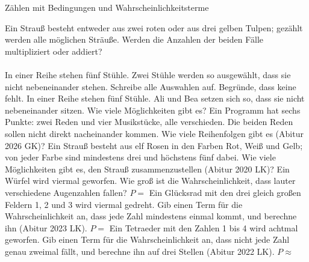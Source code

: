 \setcounter{aufgabe}{11}

\begin{aufgabe}{Zählen mit Bedingungen und Wahrscheinlichkeitsterme}
\begin{teile}
\teil Ein Strauß besteht entweder aus zwei roten oder aus drei gelben Tulpen; gezählt werden alle möglichen Sträuße. Werden die Anzahlen der beiden Fälle multipliziert oder addiert? \\  \\ 
\teil In einer Reihe stehen fünf Stühle. Zwei Stühle werden so ausgewählt, dass sie nicht nebeneinander stehen. Schreibe alle Auswahlen auf. Begründe, dass keine fehlt. \leerfeld
\teil In einer Reihe stehen fünf Stühle. Ali und Bea setzen sich so, dass sie nicht nebeneinander sitzen. Wie viele Möglichkeiten gibt es? \leerfeld
\teil Ein Programm hat sechs Punkte: zwei Reden und vier Musikstücke, alle verschieden. Die beiden Reden sollen nicht direkt nacheinander kommen. Wie viele Reihenfolgen gibt es \hfill (Abitur 2026 GK)? \leerfeld
\teil Ein Strauß besteht aus elf Rosen in den Farben Rot, Weiß und Gelb; von jeder Farbe sind mindestens drei und höchstens fünf dabei. Wie viele Möglichkeiten gibt es, den Strauß zusammenzustellen \hfill (Abitur 2020 LK)? \leerfeld
\teil Ein Würfel wird viermal geworfen. Wie groß ist die Wahrscheinlichkeit, dass lauter verschiedene Augenzahlen fallen? $P = $ \leerfeld
\teil Ein Glücksrad mit den drei gleich großen Feldern 1, 2 und 3 wird viermal gedreht. Gib einen Term für die Wahrscheinlichkeit an, dass jede Zahl mindestens einmal kommt, und berechne ihn \hfill (Abitur 2023 LK). $P = $ \leerfeld
\teil Ein Tetraeder mit den Zahlen 1 bis 4 wird achtmal geworfen. Gib einen Term für die Wahrscheinlichkeit an, dass nicht jede Zahl genau zweimal fällt, und berechne ihn auf drei Stellen \hfill (Abitur 2022 LK). $P \approx $ \leerfeld
\end{teile}
\end{aufgabe}

